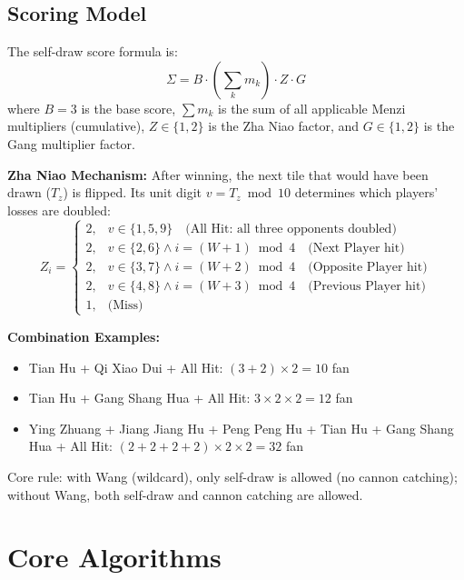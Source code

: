 \documentclass[11pt,a4paper]{article}
\begin{document}
\subsection{Scoring Model}

The self-draw score formula is:
\begin{equation}
  \Sigma = B \cdot \left(\sum_{k} m_k\right) \cdot Z \cdot G
\end{equation}
where $B=3$ is the base score, $\sum m_k$ is the sum of all applicable Menzi multipliers (cumulative), $Z\in\{1,2\}$ is the Zha Niao factor, and $G\in\{1,2\}$ is the Gang multiplier factor.

\textbf{Zha Niao Mechanism:} After winning, the next tile that would have been drawn ($T_z$) is flipped. Its unit digit $v = T_z \bmod 10$ determines which players' losses are doubled:
\begin{equation}
  Z_i = \begin{cases}
    2, & v \in \{1,5,9\} \quad\text{(All Hit: all three opponents doubled)}\\
    2, & v \in \{2,6\} \land i = (W+1)\bmod 4 \quad\text{(Next Player hit)}\\
    2, & v \in \{3,7\} \land i = (W+2)\bmod 4 \quad\text{(Opposite Player hit)}\\
    2, & v \in \{4,8\} \land i = (W+3)\bmod 4 \quad\text{(Previous Player hit)}\\
    1, & \text{(Miss)}
  \end{cases}
\end{equation}

\textbf{Combination Examples:}
\begin{itemize}[nosep]
  \item Tian Hu + Qi Xiao Dui + All Hit: $(3+2)\times 2 = 10$ fan
  \item Tian Hu + Gang Shang Hua + All Hit: $3\times 2\times 2 = 12$ fan
  \item Ying Zhuang + Jiang Jiang Hu + Peng Peng Hu + Tian Hu + Gang Shang Hua + All Hit: $(2+2+2+2)\times 2\times 2 = 32$ fan
\end{itemize}

Core rule: with Wang (wildcard), only self-draw is allowed (no cannon catching); without Wang, both self-draw and cannon catching are allowed.

\newpage
\section{Core Algorithms}
\end{document}
